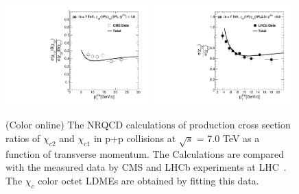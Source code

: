 \documentclass[aps,prc,preprint,superscriptaddress,showpacs,showkeys,amsmath]{revtex4-1}
\begin{document}
\begin{figure}
\includegraphics[width=0.49\textwidth]{Chic2Chic1_CMS_Fit.pdf}
\includegraphics[width=0.49\textwidth]{Chic2Chic1_LHCb_Fit.pdf}
\caption{(Color online) The NRQCD calculations of production cross section ratios 
of  $\chi_{c2}$ and $\chi_{c1}$ in p+p collisions at
$\sqrt{s}$ = 7.0 TeV as a function of transverse momentum. 
The Calculations are compared with the measured data by
CMS and LHCb experiments at LHC~\cite{Chatrchyan:2012ub,Aaij:2013dja}. The $\chi_{c}$
color octet LDMEs are obtained by fitting this data. 
}
\label{Fig:LDMEChicCMS_LHCb}
\end{figure}
\end{document}
